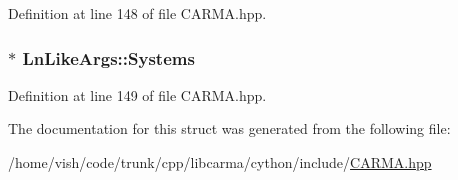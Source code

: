 Definition at line 148 of file C\-A\-R\-M\-A.\-hpp.

\hypertarget{struct_ln_like_args_af605bb6dcb409ad41dfc1a00c1e12c3f}{
\subsubsection[{Systems}]{$\ast$ Ln\-Like\-Args\-::\-Systems}}\label{struct_ln_like_args_af605bb6dcb409ad41dfc1a00c1e12c3f}


Definition at line 149 of file C\-A\-R\-M\-A.\-hpp.



The documentation for this struct was generated from the following file\-:\begin{DoxyCompactItemize}
\item 
/home/vish/code/trunk/cpp/libcarma/cython/include/\hyperlink{_c_a_r_m_a_8hpp}{C\-A\-R\-M\-A.\-hpp}\end{DoxyCompactItemize}
